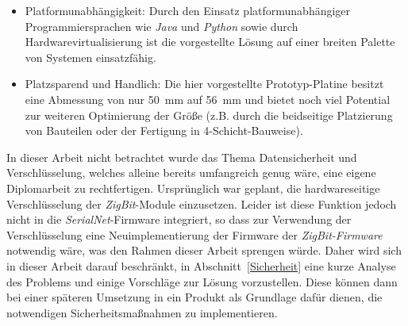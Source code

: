\begin{itemize}
    \item{Platformunabhängigkeit:} Durch den Einsatz platformunabhängiger Programmiersprachen wie \emph{Java}
          und \emph{Python} sowie durch Hardwarevirtualisierung ist die vorgestellte Lösung auf
          einer breiten Palette von Systemen einsatzfähig.

    \item{Platzsparend und Handlich:} Die hier vorgestellte Prototyp-Platine besitzt eine Abmessung von nur
          50~mm auf 56~mm und bietet noch viel Potential zur weiteren Optimierung der Größe (z.B. durch
          die beidseitige Platzierung von Bauteilen oder der Fertigung in 4-Schicht-Bauweise).
\end{itemize}

In dieser Arbeit nicht betrachtet wurde das Thema Datensicherheit und Verschlüsselung, welches alleine bereits
umfangreich genug wäre, eine eigene Diplomarbeit zu rechtfertigen. Ursprünglich war geplant, die hardwareseitige
Verschlüsselung der \emph{ZigBit}-Module einzusetzen. Leider ist diese Funktion jedoch nicht in die 
\emph{SerialNet}-Firmware integriert, so dass zur Verwendung der Verschlüsselung eine Neuimplementierung der
Firmware der \emph{ZigBit-Firmware} notwendig wäre, was den Rahmen dieser Arbeit sprengen würde. Daher wird
sich in dieser Arbeit darauf beschränkt, in Abschnitt~\ref{Sicherheit} eine kurze Analyse des Problems und einige
Vorschläge zur Lösung vorzustellen. Diese können dann bei einer späteren Umsetzung in ein Produkt als Grundlage
dafür dienen, die notwendigen Sicherheitsmaßnahmen zu implementieren.
